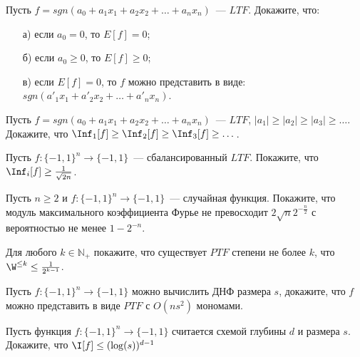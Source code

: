 
\begin{task}
    Пусть $f = sgn(a_0 + a_1 x_1 + a_2 x_2 + \dots + a_n x_n)$~--- $LTF$.
    Докажите, что:
    \begin{enumerate}[topsep = 0pt, itemsep = -1ex]
        \item [а)] если $a_0 = 0$, то $E[f] = 0$;
        \item [б)] если $a_0 \ge 0$, то $E[f] \ge 0$;
        \item [в)] если $E[f] = 0$, то $f$ можно представить в виде: $sgn(a'_1 x_1 + a'_2 x_2 + \dots + a'_n x_n)$.
	\end{enumerate}
\end{task}

\begin{task}
	Пусть $f = sgn(a_0 + a_1 x_1 + a_2 x_2 + \dots + a_n x_n)$~--- $LTF$, $|a_1| \ge |a_2| \ge |a_3| \ge \dots$. Докажите,
    что $\Inf_1[f] \ge \Inf_2[f] \ge \Inf_3[f] \ge \dots$.
\end{task}

\begin{task}
    Пусть $f: \{-1, 1\}^n \to \{-1, 1\}$~--- сбалансированный $LTF$. Покажите, что $\Inf_i[f] \ge \frac{1}{\sqrt{2 n}}$.
\end{task}

\begin{task}
    Пусть $n \ge 2$ и $f: \{-1, 1\}^n \to \{-1, 1\}$~--- случайная функция. Покажите, что модуль максимального коэффициента
    Фурье не превосходит $2 \sqrt{n} 2^{-\frac{n}{2}}$ с вероятностью не менее $1 - 2^{-n}$.
\end{task}

\begin{task}
    Для любого $k \in \mathbb{N}_{+}$ покажите, что существует $PTF$ степени не более $k$, что $\W^{\le k} \le
    \frac{1}{2^{k - 1}}$.
\end{task}

\begin{task}
    Пусть $f: \{-1, 1\}^n \to \{-1, 1\}$ можно вычислить ДНФ размера $s$, докажите, что $f$ можно представить в виде $PTF$ с
    $O(n s^2)$ мономами.
\end{task}



\breakline

\begin{ptask}{25}
    Пусть функция $f: \{-1, 1\}^n \to \{-1, 1\}$ считается схемой глубины $d$ и размера $s$. Докажите, что $\I[f] \le
    (\log(s))^{d - 1}$
\end{ptask}




